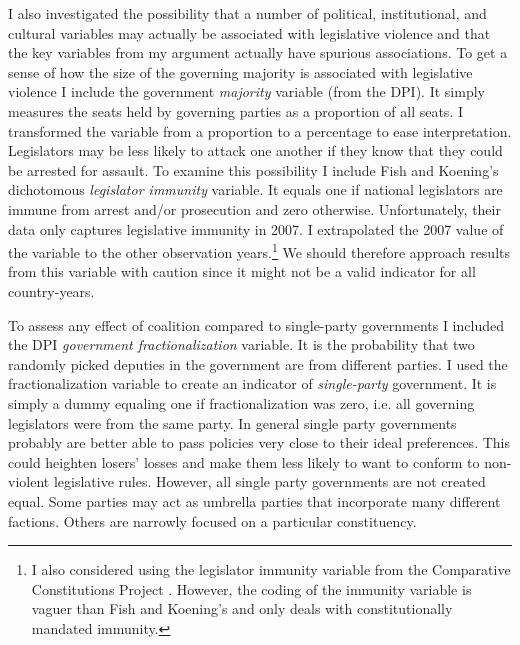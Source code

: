 \documentclass[a4paper]{article}\usepackage[]{graphicx}\usepackage[]{color}
\begin{document}
I also investigated the possibility that a number of political, institutional, and cultural variables may actually be associated with legislative violence and that the key variables from my argument actually have spurious associations. To get a sense of how the size of the governing majority is associated with legislative violence I include the government {\emph{majority}} variable (from the DPI). It simply measures the seats held by governing parties as a proportion of all seats. I transformed the variable from a proportion to a percentage to ease interpretation. Legislators may be less likely to attack one another if they know that they could be arrested for assault. To examine this possibility I include Fish and Koening's \citeyearpar{Fish2009} dichotomous \emph{legislator immunity} variable. It equals one if national legislators are immune from arrest and/or prosecution and zero otherwise. Unfortunately, their data only captures legislative immunity in 2007. I extrapolated the 2007 value of the variable to the other observation years.\footnote{I also considered using the legislator immunity variable from the Comparative Constitutions Project \citep{ElkinsCCP2010}. However, the coding of the immunity variable is vaguer than Fish and Koening's and only deals with constitutionally mandated immunity.} We should therefore approach results from this variable with caution since it might not be a valid indicator for all country-years.

To assess any effect of coalition compared to single-party governments I included the DPI {\emph{government fractionalization}} variable. It is the probability that two randomly picked deputies in the government are from different parties. I used the fractionalization variable to create an indicator of {\emph{single-party}} government. It is simply a dummy equaling one if fractionalization was zero, i.e. all governing legislators were from the same party. In general single party governments probably are better able to pass policies very close to their ideal preferences. This could heighten losers' losses and make them less likely to want to conform to non-violent legislative rules. However, all single party governments are not created equal. Some parties may act as umbrella parties that incorporate many different factions. Others are narrowly focused on a particular constituency.

 \citep{Themner2014}
\end{document}
